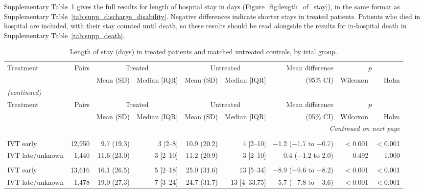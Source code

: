 \begin{landscape}
{\normalsize
Supplementary Table~\ref{tab:supp_length_of_stay} gives the full results for length of hospital stay in days (Figure~\ref{fig:length_of_stay}), in the same format as Supplementary Table~\ref{tab:supp_discharge_disability}. Negative differences indicate shorter stays in treated patients. Patients who died in hospital are included, with their stay counted until death, so these results should be read alongside the results for in-hospital death in Supplementary Table~\ref{tab:supp_death}.
\par}
\bigskip

\begin{longtable}{p{5.6cm}rrrrrrrr}
\caption{Length of stay (days) in treated patients and matched untreated controls, by trial group.}\label{tab:supp_length_of_stay}\\
\toprule
Treatment & Pairs & \multicolumn{2}{c}{Treated} & \multicolumn{2}{c}{Untreated} & Mean difference & \multicolumn{2}{c}{$p$} \\
\cmidrule(lr){3-4}\cmidrule(lr){5-6}\cmidrule(lr){8-9}
 & & Mean (SD) & Median [IQR] & Mean (SD) & Median [IQR] & (95\% CI) & Wilcoxon & Holm \\
\midrule
\endfirsthead
\multicolumn{9}{l}{\textit{(continued)}}\\
\toprule
Treatment & Pairs & \multicolumn{2}{c}{Treated} & \multicolumn{2}{c}{Untreated} & Mean difference & \multicolumn{2}{c}{$p$} \\
\cmidrule(lr){3-4}\cmidrule(lr){5-6}\cmidrule(lr){8-9}
 & & Mean (SD) & Median [IQR] & Mean (SD) & Median [IQR] & (95\% CI) & Wilcoxon & Holm \\
\midrule
\endhead
\midrule
\multicolumn{9}{r}{\textit{Continued on next page}}\\
\endfoot
\bottomrule
\endlastfoot
\multicolumn{9}{l}{\textbf{NIHSS 1--5}}\\
IVT early & 12,950 & 9.7 (19.3) & 3 [2--8] & 10.9 (20.2) & 4 [2--10] & $-$1.2 ($-$1.7 to $-$0.7) & $<$0.001 & $<$0.001 \\
IVT late/unknown & 1,440 & 11.6 (23.0) & 3 [2--10] & 11.2 (20.9) & 3 [2--10] & 0.4 ($-$1.2 to 2.0) & 0.492 & 1.000 \\
\addlinespace
\multicolumn{9}{l}{\textbf{NIHSS 6--10}}\\
IVT early & 13,616 & 16.1 (26.5) & 5 [2--18] & 25.0 (31.6) & 13 [5--34] & $-$8.9 ($-$9.6 to $-$8.2) & $<$0.001 & $<$0.001 \\
IVT late/unknown & 1,478 & 19.0 (27.3) & 7 [3--24] & 24.7 (31.7) & 13 [4--33.75] & $-$5.7 ($-$7.8 to $-$3.6) & $<$0.001 & $<$0.001 \\

\end{longtable}
\end{landscape}
